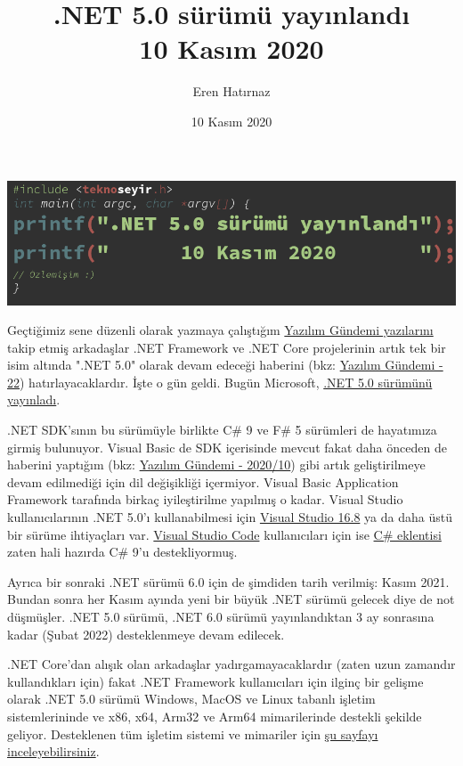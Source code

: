 \documentclass[11pt]{article}
\author{Eren Hatırnaz}
\date{10 Kasım 2020}
\title{.NET 5.0 sürümü yayınlandı\\\medskip
\large 10 Kasım 2020}
\begin{document}
\maketitle
\tableofcontents \clearpage\shorthandoff{=}

\begin{center}
\includegraphics[width=.9\linewidth]{gorseller/yazilim-gundemi-banner.png}
\end{center}

Geçtiğimiz sene düzenli olarak yazmaya çalıştığım \href{../../../README.org}{Yazılım Gündemi yazılarını}
takip etmiş arkadaşlar .NET Framework ve .NET Core projelerinin artık tek bir
isim altında ".NET 5.0" olarak devam edeceği haberini (bkz: \href{../../2019/22/yazilim-gundemi-22.pdf}{Yazılım Gündemi - 22})
hatırlayacaklardır. İşte o gün geldi. Bugün Microsoft, \href{https://devblogs.microsoft.com/dotnet/announcing-net-5-0/}{.NET 5.0 sürümünü
yayınladı}.

.NET SDK'sının bu sürümüyle birlikte C\# 9 ve F\# 5 sürümleri de hayatımıza girmiş
bulunuyor. Visual Basic de SDK içerisinde mevcut fakat daha önceden de haberini
yaptığım (bkz: \href{../../2020/10/yazilim-gundemi-2020-10.pdf}{Yazılım Gündemi - 2020/10}) gibi artık geliştirilmeye devam
edilmediği için dil değişikliği içermiyor. Visual Basic Application Framework
tarafında birkaç iyileştirilme yapılmış o kadar. Visual Studio kullanıcılarının
.NET 5.0'ı kullanabilmesi için \href{https://visualstudio.microsoft.com/}{Visual Studio 16.8} ya da daha üstü bir sürüme
ihtiyaçları var. \href{https://code.visualstudio.com/}{Visual Studio Code} kullanıcıları için ise \href{https://code.visualstudio.com/docs/languages/dotnet}{C\# eklentisi} zaten
hali hazırda C\# 9'u destekliyormuş.

Ayrıca bir sonraki .NET sürümü 6.0 için de şimdiden tarih verilmiş: Kasım 2021.
Bundan sonra her Kasım ayında yeni bir büyük .NET sürümü gelecek diye de not
düşmüşler. .NET 5.0 sürümü, .NET 6.0 sürümü yayınlandıktan 3 ay sonrasına kadar
(Şubat 2022) desteklenmeye devam edilecek.

.NET Core'dan alışık olan arkadaşlar yadırgamayacaklardır (zaten uzun zamandır
kullandıkları için) fakat .NET Framework kullanıcıları için ilginç bir gelişme
olarak .NET 5.0 sürümü Windows, MacOS ve Linux tabanlı işletim sistemlerininde
ve x86, x64, Arm32 ve Arm64 mimarilerinde destekli şekilde geliyor. Desteklenen
tüm işletim sistemi ve mimariler için \href{https://github.com/dotnet/core/blob/master/release-notes/5.0/5.0-supported-os.md}{şu sayfayı inceleyebilirsiniz}.
\end{document}
